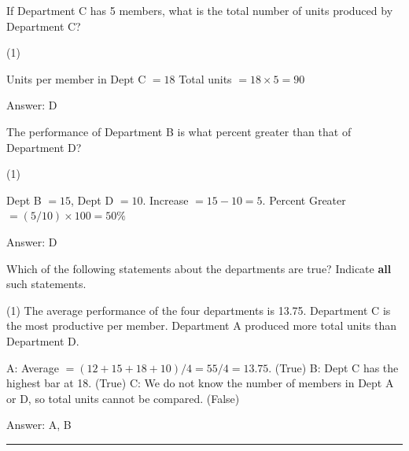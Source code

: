 \documentclass[11pt,paper=a4,answers]{exam}
\begin{document}
\begin{questions}
\question
If Department C has 5 members, what is the total number of units produced by Department C?

\begin{tasks}(1)
    
\end{tasks}

\begin{solution}
\begin{center}
Units per member in Dept C $= 18$
\vspace{5pt}
Total units $= 18 \times 5 = 90$
\end{center}

Answer: \colorbox{yellow!100}{D}
\end{solution}

\vspace{1cm}

\question
The performance of Department B is what percent greater than that of Department D?

\begin{tasks}(1)
\end{tasks}

\begin{solution}
\begin{center}
Dept B $= 15$, Dept D $= 10$.
\vspace{5pt}
Increase $= 15 - 10 = 5$.
\vspace{5pt}
Percent Greater $= (5 / 10) \times 100 = 50\%$
\end{center}

Answer: \colorbox{yellow!100}{D}
\end{solution}

\vspace{1cm}

\question
Which of the following statements about the departments are true?
Indicate \textbf{all} such statements.

\begin{tasks}(1)
\task[A)] The average performance of the four departments is 13.75.
\task[B)] Department C is the most productive per member.
\task[C)] Department A produced more total units than Department D.
\end{tasks}

\begin{solution}
\begin{center}
A: Average $= (12+15+18+10) / 4 = 55 / 4 = 13.75$. (True)
\vspace{5pt}
B: Dept C has the highest bar at 18. (True)
\vspace{5pt}
C: We do not know the number of members in Dept A or D, so total units cannot be compared. (False)
\end{center}

Answer: \colorbox{yellow!100}{A, B}
\end{solution}


\end{questions}
\begin{center}
\rule{.5\textwidth}{1pt}
\end{center}
\end{document}
